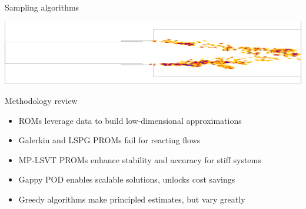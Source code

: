 \documentclass[]{beamer}
\begin{document}
\begin{frame}{Sampling algorithms}
\begin{minipage}{0.8\linewidth}
		\includegraphics[width=0.85\linewidth,trim={0.2em 2em 0.3em 2em},clip]{Images/theory/iblanks/eigenvec_iblank_z.png}
	\end{minipage}
	\vspace{-2em}
\end{frame}

\begin{frame}{Methodology review}
	\begin{itemize}
		\item ROMs leverage data to build low-dimensional approximations
		\item Galerkin and LSPG PROMs fail for reacting flows
		\item MP-LSVT PROMs enhance stability and accuracy for stiff systems
		\item Gappy POD enables scalable solutions, unlocks cost savings
		\item Greedy algorithms make principled estimates, but vary greatly
	\end{itemize}
\end{frame}

\section*{}
\end{document}
